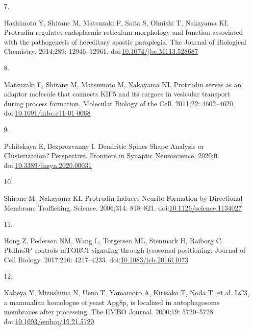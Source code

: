 \documentclass[
  12pt,
  a4paper,
]{article}
\newlength{\cslhangindent}
\newlength{\csllabelwidth}
\newlength{\cslentryspacingunit} %
\newenvironment{CSLReferences}[2] %
 {%
  \setlength{\parindent}{0pt}
  \ifodd #1
  \let\oldpar\par
  \def\par{\hangindent=\cslhangindent\oldpar}
  \fi
  \setlength{\parskip}{#2\cslentryspacingunit}
 }%
 {}
\newcommand{\CSLLeftMargin}[1]{\parbox[t]{\csllabelwidth}{#1}}
\newcommand{\CSLRightInline}[1]{\parbox[t]{\linewidth - \csllabelwidth}{#1}\break}
\begin{document}
\begin{CSLReferences}{0}{0}
\leavevmode{}%
\CSLLeftMargin{7. }%
\CSLRightInline{Hashimoto Y, Shirane M, Matsuzaki F, Saita S, Ohnishi T,
Nakayama KI. Protrudin regulates endoplasmic reticulum morphology and
function associated with the pathogenesis of hereditary spastic
paraplegia. The Journal of Biological Chemistry. 2014;289: 12946--12961.
doi:\href{https://doi.org/10.1074/jbc.M113.528687}{10.1074/jbc.M113.528687}}

\leavevmode{}%
\CSLLeftMargin{8. }%
\CSLRightInline{Matsuzaki F, Shirane M, Matsumoto M, Nakayama KI.
Protrudin serves as an adaptor molecule that connects {KIF5} and its
cargoes in vesicular transport during process formation. Molecular
Biology of the Cell. 2011;22: 4602--4620.
doi:\href{https://doi.org/10.1091/mbc.e11-01-0068}{10.1091/mbc.e11-01-0068}}

\leavevmode{}%
\CSLLeftMargin{9. }%
\CSLRightInline{Pchitskaya E, Bezprozvanny I. Dendritic {Spines Shape
Analysis}\textemdash{{Classification}} or {Clusterization}?
{Perspective}. Frontiers in Synaptic Neuroscience. 2020;0.
doi:\href{https://doi.org/10.3389/fnsyn.2020.00031}{10.3389/fnsyn.2020.00031}}

\leavevmode{}%
\CSLLeftMargin{10. }%
\CSLRightInline{Shirane M, Nakayama KI. Protrudin {Induces Neurite
Formation} by {Directional Membrane Trafficking}. Science. 2006;314:
818--821.
doi:\href{https://doi.org/10.1126/science.1134027}{10.1126/science.1134027}}

\leavevmode{}%
\CSLLeftMargin{11. }%
\CSLRightInline{Hong Z, Pedersen NM, Wang L, Torgersen ML, Stenmark H,
Raiborg C. {PtdIns3P} controls {mTORC1} signaling through lysosomal
positioning. Journal of Cell Biology. 2017;216: 4217--4233.
doi:\href{https://doi.org/10.1083/jcb.201611073}{10.1083/jcb.201611073}}

\leavevmode{}%
\CSLLeftMargin{12. }%
\CSLRightInline{Kabeya Y, Mizushima N, Ueno T, Yamamoto A, Kirisako T,
Noda T, et al. {LC3}, a mammalian homologue of yeast {Apg8p}, is
localized in autophagosome membranes after processing. The EMBO Journal.
2000;19: 5720--5728.
doi:\href{https://doi.org/10.1093/emboj/19.21.5720}{10.1093/emboj/19.21.5720}}


\end{CSLReferences}
\end{document}
